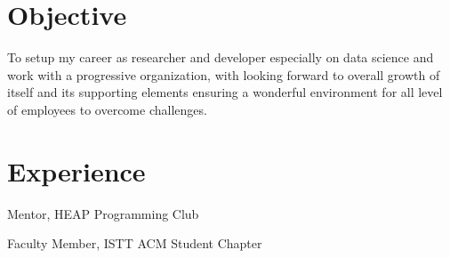 \documentclass[]{deedy-resume-openfont}
\begin{document}
\begin{minipage}[t]{0.33\textwidth}


%
%

\end{minipage} 
\hfill
\begin{minipage}[t]{0.66\textwidth} 

\section{Objective}
To setup my career as researcher and developer especially on data science and work with a progressive organization, with looking forward to overall growth of itself and its supporting elements ensuring a wonderful environment for all level of employees to overcome challenges.
\sectionsep	
	
\section{Experience}

\vspace{\topsep} %
\begin{tightemize}
	\item Mentor, HEAP Programming Club
	\item Faculty Member, ISTT ACM Student Chapter
\end{tightemize}
\sectionsep	



\end{minipage}
\end{document}
